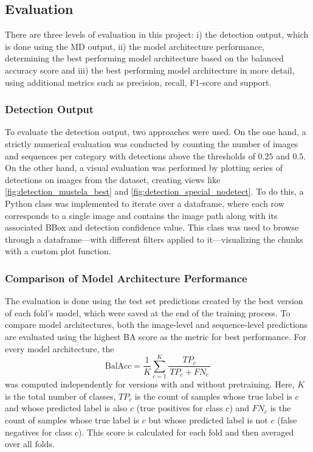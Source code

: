     \subsection{Evaluation}
    There are three levels of evaluation in this project:
    i) the detection output, which is done using the \ac{MD} output,
    ii) the model architecture performance, determining the best performing model architecture based on the balanced accuracy score and
    iii) the best performing model architecture in more detail, using additional metrics such as precision, recall, F1-score and support.

    \subsubsection{Detection Output}
    To evaluate the detection output, two approaches were used.
    On the one hand, a strictly numerical evaluation was conducted by counting the number of images and sequences per category with detections above the thresholds of \(0.25\) and \(0.5\).
    On the other hand, a visual evaluation was performed by plotting series of detections on images from the dataset, creating views like \autoref{fig:detection_mustela_best} and \autoref{fig:detection_special_nodetect}.
    To do this, a Python class was implemented to iterate over a dataframe, where each row corresponds to a single image and contains the image path along with its associated \ac{BBox} and detection confidence value.
    This class was used to browse through a dataframe---with different filters applied to it---visualizing the chunks with a custom plot function.

    \subsubsection{Comparison of Model Architecture Performance}
    The evaluation is done using the test set predictions created by the best version of each fold's model, which were saved at the end of the training process.
    To compare model architectures, both the image-level and sequence-level predictions are evaluated using the highest \ac{BA} score as the metric for best performance.
    For every model architecture, the
    \begin{equation}
        \text{BalAcc} =
        \frac{1}{K} \sum_{c=1}^{K}
        \frac{TP_{c}}{\,TP_{c} + FN_{c}\,}
    \end{equation}
    was computed independently for versions with and without pretraining.
    Here, \(K\) is the total number of classes, \(TP_{c}\) is the count of samples whose true label is \(c\) and whose predicted label is also \(c\) (true positives for class \(c\)) and \(FN_{c}\) is the count of samples whose true label is \(c\) but whose predicted label is not \(c\) (false negatives for class \(c\)).
    This score is calculated for each fold and then averaged over all folds.

